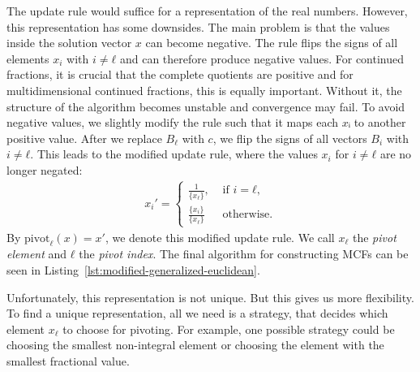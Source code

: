 The update rule would suffice for a representation of the real numbers.
However, this representation has some downsides.
The main problem is that the values inside the solution vector $x$ can become negative.
The rule flips the signs of all elements $x_i$ with $i ≠ ℓ$
and can therefore produce negative values.
For continued fractions, it is crucial that the complete quotients are positive \cite{Northshield11}
and for multidimensional continued fractions, this is equally important.
Without it, the structure of the algorithm becomes unstable and convergence may fail.
To avoid negative values, we slightly modify the rule such that it maps each $xᵢ$ to another positive value.
After we replace $B_ℓ$ with $c$, we flip the signs of all vectors $B_i$ with $i ≠ ℓ$.
This leads to the modified update rule, where the values $x_i$ for $i ≠ ℓ$ are
no longer negated:
\begin{align}
  \label{eq:modified-update-rule}
  x_i' =
  \begin{cases}
    \frac{1}{\{x_ℓ\}},  & \text{ if } i = ℓ, \\
    \frac{\{x_i\}}{\{x_ℓ\}} & \text{ otherwise.}
  \end{cases}
\end{align}
By $\mathrm{pivot}_ℓ(x) = x'$, we denote this modified update rule.
We call $x_ℓ$ the \emph{pivot element} and $ℓ$ the \emph{pivot index}.
The final algorithm for constructing MCFs can be seen in
Listing~\ref{lst:modified-generalized-euclidean}.

Unfortunately, this representation is not unique.
But this gives us more flexibility.
To find a unique representation, all we need is a strategy,
that decides which element $x_ℓ$ to choose for pivoting.
For example, one possible strategy could be choosing the smallest non-integral
element or choosing the element with the smallest fractional value.

